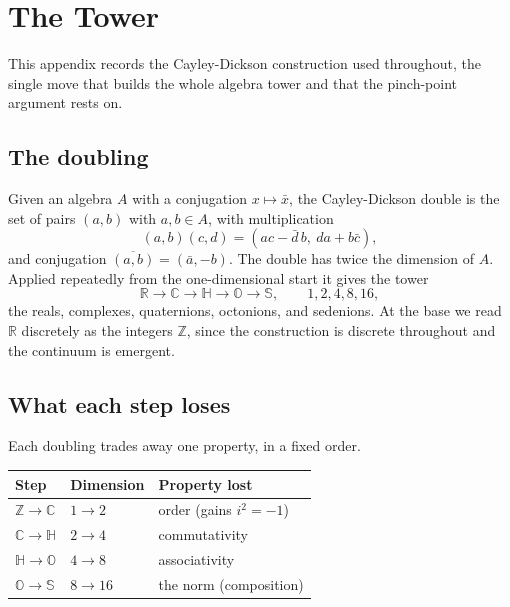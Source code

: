 \section{The Tower} \label{app:tower}

This appendix records the Cayley-Dickson construction used throughout, the single move that builds the whole algebra
tower and that the pinch-point argument rests on.

\subsection*{The doubling}

Given an algebra $A$ with a conjugation $x \mapsto \bar{x}$, the Cayley-Dickson double is the set of pairs
$(a, b)$ with $a, b \in A$, with multiplication
\begin{equation}
  (a, b)(c, d) = (ac - \bar{d}\,b, \ d a + b \bar{c}),
\end{equation}
and conjugation $\overline{(a,b)} = (\bar{a}, -b)$. The double has twice the dimension of $A$. Applied repeatedly from
the one-dimensional start it gives the tower
\begin{equation}
  \mathbb{R} \to \mathbb{C} \to \mathbb{H} \to \mathbb{O} \to \mathbb{S}, \qquad 1, 2, 4, 8, 16,
\end{equation}
the reals, complexes, quaternions, octonions, and sedenions. At the base we read $\mathbb{R}$ discretely as the
integers $\mathbb{Z}$, since the construction is discrete throughout and the continuum is emergent.

\subsection*{What each step loses}

Each doubling trades away one property, in a fixed order.

\begin{center}
\begin{tabular}{lll}
  \hline
  Step & Dimension & Property lost \\
  \hline
  $\mathbb{Z} \to \mathbb{C}$ & $1 \to 2$ & order (gains $i^2 = -1$) \\
  $\mathbb{C} \to \mathbb{H}$ & $2 \to 4$ & commutativity \\
  $\mathbb{H} \to \mathbb{O}$ & $4 \to 8$ & associativity \\
  $\mathbb{O} \to \mathbb{S}$ & $8 \to 16$ & the norm (composition) \\
  \hline
\end{tabular}
\end{center}

